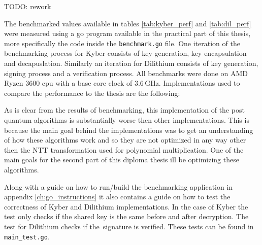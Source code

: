 TODO: rework

The benchmarked values available in tables \ref{tab:kyber_perf} and \ref{tab:dil_perf} were measured using a go program available in the practical part of this thesis, more specifically the code inside the \texttt{benchmark.go} file. One iteration of the benchmarking process for Kyber consists of key generation, key encapsulation and decapuslation. Similarly an iteration for Dilithium consists of key generation, signing process and a verification process. All benchmarks were done on AMD Ryzen 3600 cpu with a base core clock of 3.6\,GHz. Implementations used to compare the performance to the thesis are the following:
\begin{itemize}
\end{itemize}
\noindent As is clear from the results of benchmarking, this implementation of the post quantum algorithms is substantially worse then other implementations. This is because the main goal behind the implementations was to get an understanding of how these algorithms work and so they are not optimized in any way other then the NTT transformation used for polynomial multiplication. One of the main goals for the second part of this diploma thesis ill be optimizing these algorithms.

Along with a guide on how to run/build the benchmarking application in appendix \ref{ch:go_instructions} it also contains a guide on how to test the correctness of Kyber and Dilithium implementations. In the case of Kyber the test only checks if the shared key is the same before and after decryption. The test for Dilithium checks if the~signature is verified. These tests can be found in \texttt{main\_test.go}.
